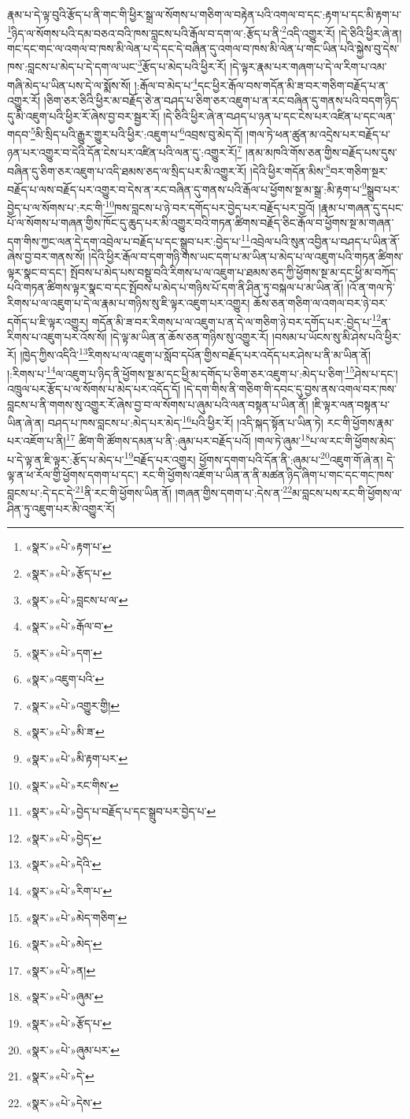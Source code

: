 རྣམ་པ་དེ་ལྟ་བུའི་རྩོད་པ་ནི་གང་གི་ཕྱིར་སྒྲ་ལ་སོགས་པ་གཅིག་ལ་བརྟེན་པའི་འགལ་བ་དང་:རྟག་པ་དང་མི་རྟག་པ་\footnote{«སྣར་»«པེ་»རྟག་པ་}ཉིད་ལ་སོགས་པའི་དམ་བཅའ་བའི་ཁས་བླངས་པའི་རྒོལ་བ་དག་ལ་:རྩོད་པ་ནི་\footnote{«སྣར་»«པེ་»རྩོད་པ་}འདི་འགྱུར་རོ། །དེ་ཅིའི་ཕྱིར་ཞེ་ན། གང་དང་གང་ལ་འགལ་བ་ཁས་མི་ལེན་པ་དེ་དང་དེ་བཞིན་དུ་འགལ་བ་ཁས་མི་ལེན་པ་གང་ཡིན་པའི་སྐྱེས་བུ་དེས་ཁས་:བླངས་པ་མེད་པ་དེ་དག་ལ་ཡང་\footnote{«སྣར་»«པེ་»བླངས་པ་ལ་}རྩོད་པ་མེད་པའི་ཕྱིར་རོ། །དེ་ལྟར་རྣམ་པར་གཞག་པ་དེ་ལ་རིག་པ་འམ་གཞི་མེད་པ་ཡིན་པས་དེ་ལ་སྨོས་སོ། །:རྒོལ་བ་མེད་པ་\footnote{«སྣར་»«པེ་»རྒོལ་བ་}དང་ཕྱིར་རྒོལ་བས་གདོན་མི་ཟ་བར་གཅིག་བརྗོད་པ་ན་འགྱུར་རོ། །ཅིག་ཅར་ཅིའི་ཕྱིར་མ་བརྗོད་ཅེ་ན་བཤད་པ་ཅིག་ཅར་འཇུག་པ་ན་རང་བཞིན་དུ་གནས་པའི་བདག་ཉིད་དུ་མི་འཇུག་པའི་ཕྱིར་རོ་ཞེས་བྱ་བར་སྦྱར་རོ། །དེ་ཅིའི་ཕྱིར་ཞེ་ན་བཤད་པ་ཉན་པ་དང་ངེས་པར་འཛིན་པ་དང་ལན་གདབ་\footnote{«སྣར་»«པེ་»དག་}མི་སྲིད་པའི་རྒྱུར་གྱུར་པའི་ཕྱིར་:འཇུག་པ་\footnote{«སྣར་»འཇུག་པའི་}འབྲས་བུ་མེད་དོ། །གལ་ཏེ་ཕན་ཚུན་མ་འདྲེས་པར་བརྗོད་པ་ཉན་པར་འགྱུར་བ་དེའི་དོན་ངེས་པར་འཛིན་པའི་ལན་དུ་:འགྱུར་རོ།\footnote{«སྣར་»«པེ་»འགྱུར་གྱི།} །ནམ་མཁའི་གོས་ཅན་གྱིས་བརྗོད་པས་དུས་བཞིན་དུ་ཅིག་ཅར་འཇུག་པ་འདི་ཐམས་ཅད་ལ་སྲིད་པར་མི་འགྱུར་རོ། །དེའི་ཕྱིར་གདོན་མིས་\footnote{«སྣར་»«པེ་»མི་ཟ་}བར་གཅིག་སྔར་བརྗོད་པ་ལས་བརྗོད་པར་འགྱུར་བ་དེས་ན་རང་བཞིན་དུ་གནས་པའི་རྒོལ་པ་ཕྱོགས་སྔ་མ་སྒྲ་:མི་རྟག་པ་\footnote{«སྣར་»«པེ་»མི་རྟག་པར་}སྒྲུབ་པར་བྱེད་པ་ལ་སོགས་པ་:རང་གི་\footnote{«སྣར་»«པེ་»རང་གིས་}ཁས་བླངས་པ་ཉེ་བར་དགོད་པར་བྱེད་པར་བརྗོད་པར་བྱའོ། །རྣམ་པ་གཞན་དུ་དཔང་པོ་ལ་སོགས་པ་གཞན་གྱིས་ཁོང་དུ་ཆུད་པར་མི་འགྱུར་བའི་གཏན་ཚིགས་བརྗོད་ཅིང་རྒོལ་བ་ཕྱོགས་སྔ་མ་གཞན་དག་གིས་ཀྱང་ལན་དེ་དག་འབྲེལ་པ་བརྗོད་པ་དང་སྒྲུབ་པར་:བྱེད་པ་\footnote{«སྣར་»«པེ་»བྱེད་པ་བརྗོད་པ་དང་སྒྲུབ་པར་བྱེད་པ་}འབྲེལ་པའི་སུན་འབྱིན་པ་བཤད་པ་ཡིན་ནོ་ཞེས་བྱ་བར་གནས་སོ། །དེའི་ཕྱིར་རྒོལ་བ་དག་གཉི་གས་ཡང་དག་པ་མ་ཡིན་པ་མེད་པ་ལ་འཇུག་པའི་གཏན་ཚིགས་ལྟར་སྣང་བ་དང་། སྤོབས་པ་མེད་པས་བསྡུ་བའི་རིགས་པ་ལ་འཇུག་པ་ཐམས་ཅད་ཀྱི་ཕྱོགས་སྔ་མ་དང་ཕྱི་མ་བཀོད་པའི་གཏན་ཚིགས་ལྟར་སྣང་བ་དང་སྤོབས་པ་མེད་པ་གཉིས་པོ་དག་ནི་ཤིན་ཏུ་བསྐལ་པ་མ་ཡིན་ནོ། །འོ་ན་གལ་ཏེ་རིགས་པ་ལ་འཇུག་པ་དེ་ལ་རྣམ་པ་གཉིས་སུ་ཇི་ལྟར་འཇུག་པར་འགྱུར། ཆོས་ཅན་གཅིག་ལ་འགལ་བར་ཉེ་བར་དགོད་པ་ཇི་ལྟར་འགྱུར། གདོན་མི་ཟ་བར་རིགས་པ་ལ་འཇུག་པ་ན་དེ་ལ་གཅིག་ཉེ་བར་དགོད་པར་:བྱེད་པ་\footnote{«སྣར་»«པེ་»བྱེད་}ན་རིགས་པ་འཇུག་པར་འོས་སོ། །དེ་ལྟ་མ་ཡིན་ན་ཆོས་ཅན་གཉིས་སུ་འགྱུར་རོ། །བསམ་པ་ཡོངས་སུ་མི་ཤེས་པའི་ཕྱིར་རོ། །ཁྱེད་ཀྱིས་འདིའི་\footnote{«སྣར་»«པེ་»དེའི་}རིགས་པ་ལ་འཇུག་པ་སློབ་དཔོན་གྱིས་བརྗོད་པར་འདོད་པར་ཤེས་པ་ནི་མ་ཡིན་ནོ། །:རིགས་པ་\footnote{«སྣར་»«པེ་»རིག་པ་}ལ་འཇུག་པ་ཉིད་ནི་ཕྱོགས་སྔ་མ་དང་ཕྱི་མ་དགོད་པ་ཅིག་ཅར་འཇུག་པ་:མེད་པ་ཅིག་\footnote{«སྣར་»«པེ་»མེད་གཅིག་}ཤེས་པ་དང་། འཁྲུལ་པར་རྩོད་པ་ལ་སོགས་པ་མེད་པར་འདོད་དོ། །དེ་དག་གིས་ནི་གཅིག་གི་དབང་དུ་བྱས་ནས་འགལ་བར་ཁས་བླངས་པ་ནི་གགས་སུ་འགྱུར་རོ་ཞེས་བྱ་བ་ལ་སོགས་པ་ཞུམ་པའི་ལན་བསྟན་པ་ཡིན་ནོ། །ཇི་ལྟར་ལན་བསྟན་པ་ཡིན་ཞེ་ན། བཤད་པ་ཁས་བླངས་པ་:མེད་པར་མེད་\footnote{«སྣར་»«པེ་»མེད་}པའི་ཕྱིར་རོ། །འདི་སྐད་སྟོན་པ་ཡིན་ཏེ། རང་གི་ཕྱོགས་རྣམ་པར་འཇོག་པ་ནི།\footnote{«སྣར་»«པེ་»ན།} ཚིག་གི་ཚོགས་དམན་པ་ནི་:ཞུམ་པར་བརྗོད་པའོ། །གལ་ཏེ་ཞུམ་\footnote{«སྣར་»«པེ་»ཞུམ་}པ་ལ་རང་གི་ཕྱོགས་མེད་པ་དེ་ལྟ་ན་ཇི་ལྟར་:རྩོད་པ་མེད་པ་\footnote{«སྣར་»«པེ་»རྩོད་པ་}བརྗོད་པར་འགྱུར། ཕྱོགས་དགག་པའི་དོན་ནི་:ཞུམ་པ་\footnote{«སྣར་»«པེ་»ཞུམ་པར་}འཇུག་གོ་ཞེ་ན། དེ་ལྟ་ན་ཕ་རོལ་གྱི་ཕྱོགས་དགག་པ་དང་། རང་གི་ཕྱོགས་འཇོག་པ་ཡིན་ན་ནི་མཚན་ཉིད་ཞིག་པ་གང་དང་གང་ཁས་བླངས་པ་:དེ་དང་དེ་\footnote{«སྣར་»«པེ་»དེ་}ནི་རང་གི་ཕྱོགས་ཡིན་ནོ། །གཞན་གྱིས་དགག་པ་:དེས་ན་\footnote{«སྣར་»«པེ་»དེས་}མ་བླངས་པས་རང་གི་ཕྱོགས་ལ་ཤིན་ཏུ་འཇུག་པར་མི་འགྱུར་རོ། 